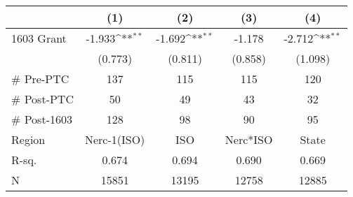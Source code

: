 {
\def\sym#1{\ifmmode^{#1}\else\(^{#1}\)\fi}
\begin{tabular}{l*{4}{c}}
\toprule
                    &\multicolumn{1}{c}{(1)}         &\multicolumn{1}{c}{(2)}         &\multicolumn{1}{c}{(3)}         &\multicolumn{1}{c}{(4)}         \\
\midrule
1603 Grant          &      -1.933\sym{**} &      -1.692\sym{**} &      -1.178         &      -2.712\sym{**} \\
                    &     (0.773)         &     (0.811)         &     (0.858)         &     (1.098)         \\
\midrule
\# Pre-PTC          &         137         &         115         &         115         &         120         \\
\# Post-PTC         &          50         &          49         &          43         &          32         \\
\# Post-1603        &         128         &          98         &          90         &          95         \\
Region              & Nerc-1(ISO)         &         ISO         &    Nerc*ISO         &       State         \\
R-sq.               &       0.674         &       0.694         &       0.690         &       0.669         \\
N                   &       15851         &       13195         &       12758         &       12885         \\
\bottomrule
\end{tabular}
}
